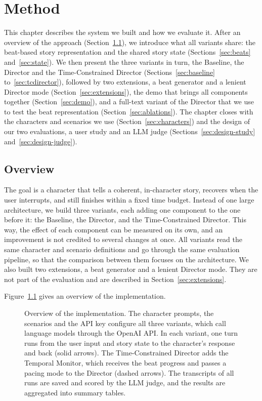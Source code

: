 \chapter{Method}\label{sec:method}

This chapter describes the system we built and how we evaluate it. After an overview of the approach (Section~\ref{sec:overview}), we introduce what all variants share: the beat-based story representation and the shared story state (Sections~\ref{sec:beats} and~\ref{sec:state}). We then present the three variants in turn, the Baseline, the Director and the Time-Constrained Director (Sections~\ref{sec:baseline} to~\ref{sec:tcdirector}), followed by two extensions, a beat generator and a lenient Director mode (Section~\ref{sec:extensions}), the demo that brings all components together (Section~\ref{sec:demo}), and a full-text variant of the Director that we use to test the beat representation (Section~\ref{sec:ablations}). The chapter closes with the characters and scenarios we use (Section~\ref{sec:characters}) and the design of our two evaluations, a user study and an LLM judge (Sections~\ref{sec:design-study} and~\ref{sec:design-judge}).

\section{Overview}\label{sec:overview}

The goal is a character that tells a coherent, in-character story, recovers when the user interrupts, and still finishes within a fixed time budget. Instead of one large architecture, we build three variants, each adding one component to the one before it: the Baseline, the Director, and the Time-Constrained Director. This way, the effect of each component can be measured on its own, and an improvement is not credited to several changes at once. All variants read the same character and scenario definitions and go through the same evaluation pipeline, so that the comparison between them focuses on the architecture. We also built two extensions, a beat generator and a lenient Director mode. They are not part of the evaluation and are described in Section~\ref{sec:extensions}.

Figure~\ref{fig:system} gives an overview of the implementation.

\begin{figure}[htbp]
\centering
\resizebox{\linewidth}{!}{}
\caption{Overview of the implementation. The character prompts, the scenarios and the API key configure all three variants, which call language models through the OpenAI API. In each variant, one turn runs from the user input and story state to the character's response and back (solid arrows). The Time-Constrained Director adds the Temporal Monitor, which receives the beat progress and passes a pacing mode to the Director (dashed arrows). The transcripts of all runs are saved and scored by the LLM judge, and the results are aggregated into summary tables.}
\label{fig:system}
\end{figure}

